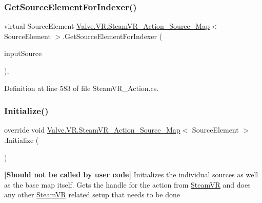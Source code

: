 \subsubsection{\texorpdfstring{GetSourceElementForIndexer()}{GetSourceElementForIndexer()}}
{\footnotesize\ttfamily virtual Source\+Element \mbox{\hyperlink{class_valve_1_1_v_r_1_1_steam_v_r___action___source___map}{Valve.\+V\+R.\+Steam\+V\+R\+\_\+\+Action\+\_\+\+Source\+\_\+\+Map}}$<$ Source\+Element $>$.Get\+Source\+Element\+For\+Indexer (\begin{DoxyParamCaption}\item[{\mbox{\hyperlink{namespace_valve_1_1_v_r_a82e5bf501cc3aa155444ee3f0662853f}{Steam\+V\+R\+\_\+\+Input\+\_\+\+Sources}}}]{input\+Source }\end{DoxyParamCaption})\hspace{0.3cm}{\ttfamily [protected]}, {\ttfamily [virtual]}}



Definition at line 583 of file Steam\+V\+R\+\_\+\+Action.\+cs.

\mbox{\label{class_valve_1_1_v_r_1_1_steam_v_r___action___source___map_af035d2609891383f3735ced3cfa1b9ab}} 
\subsubsection{\texorpdfstring{Initialize()}{Initialize()}\hspace{0.1cm}{\footnotesize\ttfamily [1/2]}}
{\footnotesize\ttfamily override void \mbox{\hyperlink{class_valve_1_1_v_r_1_1_steam_v_r___action___source___map}{Valve.\+V\+R.\+Steam\+V\+R\+\_\+\+Action\+\_\+\+Source\+\_\+\+Map}}$<$ Source\+Element $>$.Initialize (\begin{DoxyParamCaption}{ }\end{DoxyParamCaption})}



{\bfseries{\mbox{[}Should not be called by user code\mbox{]}}} Initializes the individual sources as well as the base map itself. Gets the handle for the action from \mbox{\hyperlink{class_valve_1_1_v_r_1_1_steam_v_r}{Steam\+VR}} and does any other \mbox{\hyperlink{class_valve_1_1_v_r_1_1_steam_v_r}{Steam\+VR}} related setup that needs to be done 



